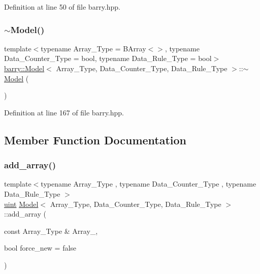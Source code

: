 Definition at line 50 of file barry.\+hpp.

\mbox{\label{classbarry_1_1_model_a2b8617c8bb1b8c76bbaa0f596af0c132}} 
\subsubsection{\texorpdfstring{$\sim$\+Model()}{~Model()}}
{\footnotesize\ttfamily template$<$typename Array\+\_\+\+Type  = B\+Array$<$$>$, typename Data\+\_\+\+Counter\+\_\+\+Type  = bool, typename Data\+\_\+\+Rule\+\_\+\+Type  = bool$>$ \\
\hyperlink{classbarry_1_1_model}{barry\+::\+Model}$<$ Array\+\_\+\+Type, Data\+\_\+\+Counter\+\_\+\+Type, Data\+\_\+\+Rule\+\_\+\+Type $>$\+::$\sim$\hyperlink{classbarry_1_1_model}{Model} (\begin{DoxyParamCaption}{ }\end{DoxyParamCaption})\hspace{0.3cm}{\ttfamily [inline]}}



Definition at line 167 of file barry.\+hpp.



\subsection{Member Function Documentation}
\mbox{\label{classbarry_1_1_model_a17a2205b52c03bb29eefb8fb126a01f6}} 
\subsubsection{\texorpdfstring{add\+\_\+array()}{add\_array()}}
{\footnotesize\ttfamily template$<$typename Array\+\_\+\+Type , typename Data\+\_\+\+Counter\+\_\+\+Type , typename Data\+\_\+\+Rule\+\_\+\+Type $>$ \\
\hyperlink{namespacebarry_a11dfc53ddb4672278319aa04f1e09a6c}{uint} \hyperlink{classbarry_1_1_model}{Model}$<$ Array\+\_\+\+Type, Data\+\_\+\+Counter\+\_\+\+Type, Data\+\_\+\+Rule\+\_\+\+Type $>$\+::add\+\_\+array (\begin{DoxyParamCaption}\item[{const Array\+\_\+\+Type \&}]{Array\+\_\+,  }\item[{bool}]{force\+\_\+new = {\ttfamily false} }\end{DoxyParamCaption})\hspace{0.3cm}{\ttfamily [inline]}}



